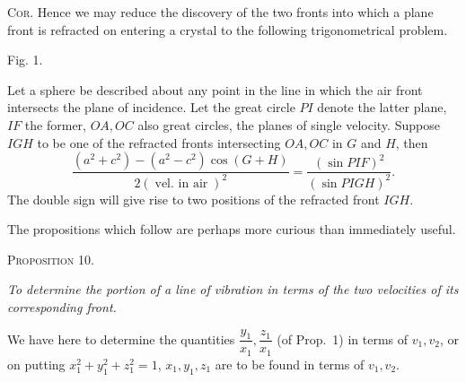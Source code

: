 \documentclass[11pt]{article}
\newcommand{\proposition}[1]{\vspace{0.9em}\begin{center}{\scshape Proposition #1.}\end{center}\vspace{0.2em}}
\newcommand{\sourcepage}[1]{\marginpar{\scriptsize p.~#1}}
\begin{document}
\textsc{Cor.} Hence we may reduce the discovery of the two fronts into which a plane front is refracted on entering a crystal to the following trigonometrical problem.

\begin{center}
\par
{\small Fig. 1.}
\end{center}

Let a sphere be described about any point in the line in which the air front intersects the plane of incidence. Let the great circle $PI$ denote the latter plane, $IF$ the former, $OA,OC$ also great circles, the planes of single velocity. Suppose $IGH$ to be one of the refracted fronts intersecting $OA,OC$ in $G$ and $H$, then
\[
 \frac{(a^2+c^2)-(a^2-c^2)\cos(G+H)}{2(\operatorname{vel.\ in\ air})^2}
=\frac{(\sin PIF)^2}{(\sin PIGH)^2}.
\]
The double sign will give rise to two positions of the refracted front $IGH$.

The propositions which follow are perhaps more curious than immediately useful.

\sourcepage{10}
\proposition{10}

\emph{To determine the portion of a line of vibration in terms of the two velocities of its corresponding front.}

We have here to determine the quantities $\dfrac{y_1}{x_1},\dfrac{z_1}{x_1}$ (of Prop.~1) in terms of $v_1,v_2$, or on putting $x_1^2+y_1^2+z_1^2=1$, $x_1,y_1,z_1$ are to be found in terms of $v_1,v_2$.
\end{document}
